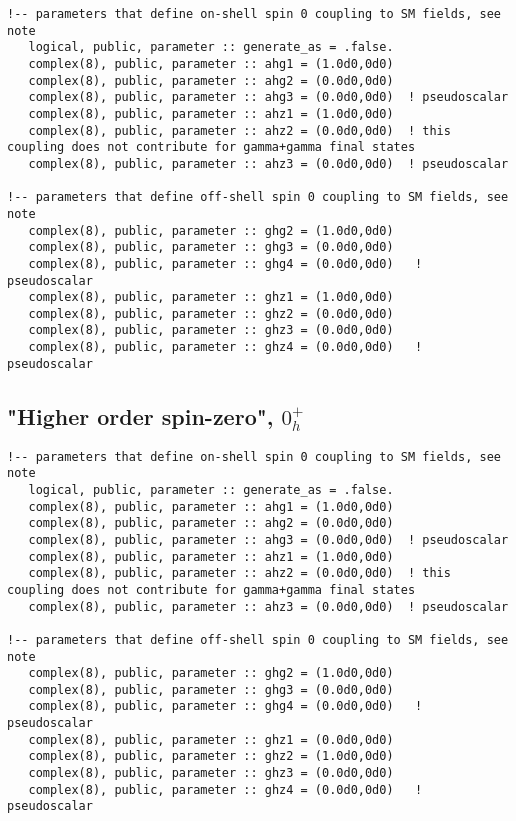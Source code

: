 \documentclass[aps,superscriptaddress,nofootinbib]{revtex4}
\begin{document}
\footnotesize
\begin{verbatim}
!-- parameters that define on-shell spin 0 coupling to SM fields, see note
   logical, public, parameter :: generate_as = .false.
   complex(8), public, parameter :: ahg1 = (1.0d0,0d0)
   complex(8), public, parameter :: ahg2 = (0.0d0,0d0)
   complex(8), public, parameter :: ahg3 = (0.0d0,0d0)  ! pseudoscalar
   complex(8), public, parameter :: ahz1 = (1.0d0,0d0)
   complex(8), public, parameter :: ahz2 = (0.0d0,0d0)  ! this coupling does not contribute for gamma+gamma final states
   complex(8), public, parameter :: ahz3 = (0.0d0,0d0)  ! pseudoscalar

!-- parameters that define off-shell spin 0 coupling to SM fields, see note
   complex(8), public, parameter :: ghg2 = (1.0d0,0d0)
   complex(8), public, parameter :: ghg3 = (0.0d0,0d0)
   complex(8), public, parameter :: ghg4 = (0.0d0,0d0)   ! pseudoscalar
   complex(8), public, parameter :: ghz1 = (1.0d0,0d0)
   complex(8), public, parameter :: ghz2 = (0.0d0,0d0)
   complex(8), public, parameter :: ghz3 = (0.0d0,0d0)
   complex(8), public, parameter :: ghz4 = (0.0d0,0d0)   ! pseudoscalar
\end{verbatim}
\normalsize

\subsection{"Higher order spin-zero", $0_h^+$}

\footnotesize
\begin{verbatim}
!-- parameters that define on-shell spin 0 coupling to SM fields, see note
   logical, public, parameter :: generate_as = .false.
   complex(8), public, parameter :: ahg1 = (1.0d0,0d0)
   complex(8), public, parameter :: ahg2 = (0.0d0,0d0)
   complex(8), public, parameter :: ahg3 = (0.0d0,0d0)  ! pseudoscalar
   complex(8), public, parameter :: ahz1 = (1.0d0,0d0)
   complex(8), public, parameter :: ahz2 = (0.0d0,0d0)  ! this coupling does not contribute for gamma+gamma final states
   complex(8), public, parameter :: ahz3 = (0.0d0,0d0)  ! pseudoscalar

!-- parameters that define off-shell spin 0 coupling to SM fields, see note
   complex(8), public, parameter :: ghg2 = (1.0d0,0d0)
   complex(8), public, parameter :: ghg3 = (0.0d0,0d0)
   complex(8), public, parameter :: ghg4 = (0.0d0,0d0)   ! pseudoscalar
   complex(8), public, parameter :: ghz1 = (0.0d0,0d0)
   complex(8), public, parameter :: ghz2 = (1.0d0,0d0)
   complex(8), public, parameter :: ghz3 = (0.0d0,0d0)
   complex(8), public, parameter :: ghz4 = (0.0d0,0d0)   ! pseudoscalar
\end{verbatim}
\normalsize
\end{document}
